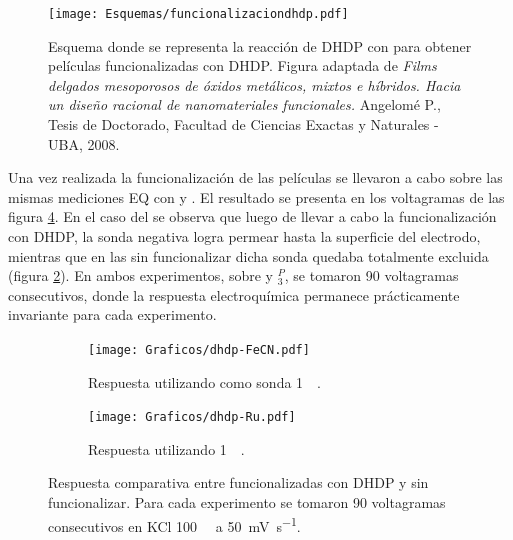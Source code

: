 				 \begin{figure}[ht!]	
					\centering
			 	    \texttt{[image: Esquemas/funcionalizaciondhdp.pdf]}
			        \caption[Funcionalización con DHDP 3mM]{Esquema donde se representa la reacción de DHDP con \pdmZ\space para obtener películas funcionalizadas con DHDP. Figura adaptada de \textit{Films delgados mesoporosos de óxidos metálicos, mixtos e híbridos. Hacia un diseño racional de nanomateriales funcionales.} Angelomé P., Tesis de Doctorado, Facultad de Ciencias Exactas y Naturales - UBA, 2008.\cite{Angelome2008}}
			        \label{esq:dhdp-esquema}
			      	\end{figure}

		    Una vez realizada la funcionalización de las películas se llevaron a cabo sobre las mismas mediciones EQ con \fe\space y \ru. El resultado se presenta en los voltagramas de las figura \ref{fig:dhdp-vc}. En el caso del \fe\space se observa que luego de llevar a cabo la funcionalización con DHDP, la sonda negativa logra permear hasta la superficie del electrodo, mientras que en las \pdmZ\space sin funcionalizar dicha sonda quedaba totalmente excluida (figura \ref{fig:dhdp-vc-fe}). En ambos experimentos, sobre \pdmZ\space y \pdmZ$^P_3$, se tomaron 90 voltagramas consecutivos, donde la respuesta electroquímica permanece prácticamente invariante para cada experimento.
		    
		    	 \begin{figure}[ht]	
					\begin{subfigure}[t]{0.495\textwidth}
			 	    \texttt{[image: Graficos/dhdp-FeCN.pdf]}
			        \caption{Respuesta utilizando como sonda \ferroferri\space \SI{1}{\milli\Molar}.}
			        \label{fig:dhdp-vc-fe}
			        \end{subfigure}
			        \begin{subfigure}[t]{0.495\textwidth}
			 	    \texttt{[image: Graficos/dhdp-Ru.pdf]}
			        \caption{Respuesta utilizando \aminorutenio\space \SI{1}{\milli\Molar}.}
			        \label{fig:dhdp-vc-ru}
			        \end{subfigure}
			        \caption[Voltagramas de \pdmZ$^P_3$ con \aminorutenio\space y \ferroferri]{Respuesta comparativa entre \pdmZ\space funcionalizadas con DHDP y sin funcionalizar. Para cada experimento se tomaron 90 voltagramas consecutivos en KCl \SI{100}{\milli\Molar} a \SI{50}{\milli\volt\per\second}.}
			        \label{fig:dhdp-vc}
			      	\end{figure}

		    \pagebreak

